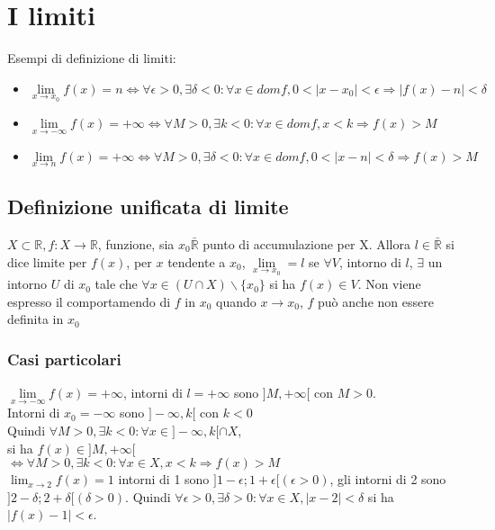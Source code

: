 \chapter{I limiti}
Esempi di definizione di limiti:
\begin{itemize}
\item $\lim\limits_{x\rightarrow x_0}f(x)=n\Leftrightarrow\forall \epsilon>0, \exists \delta<0: \forall x\in domf, 0<|x-x_0|<\epsilon\Rightarrow |f(x)-n|<\delta$\\
\item $\lim\limits_{x\rightarrow -\infty}f(x)=+\infty\Leftrightarrow\forall M>0, \exists k<0: \forall x\in domf, x<k\Rightarrow f(x)>M$\\
\item $\lim\limits_{x\rightarrow n}f(x)=+\infty\Leftrightarrow\forall M>0, \exists \delta<0: \forall x\in domf, 0<|x-n|<\delta\Rightarrow f(x)>M$\\
\end{itemize}
\section{Definizione unificata di limite}
$X\subset\mathbb{R}, f:X\rightarrow\mathbb{R}$, funzione, sia $x_0\bar{\mathbb{R}}$ punto di accumulazione per X. Allora $l\in\bar{\mathbb{R}}$ si dice limite per $f(x)$, per 
$x$ tendente a $x_0$, $\lim\limits_{x \rightarrow x_0}=l$ se $\forall V$, intorno di $l$, $\exists$ un intorno $U$ di $x_0$ tale che $\forall x\in (U\cap X)\backslash\{x_0\}$ si ha $f(x)\in V$. Non viene espresso il comportamendo di $f$ in $x_0$ quando $x\rightarrow x_0$, $f$ pu\`o anche non essere definita in $x_0$
\subsection{Casi particolari}
$\lim\limits_{x\rightarrow -\infty} f(x)=+\infty$, intorni di $l=+\infty$ sono $]M,+\infty[$ con $M>0$.\\
Intorni di $x_0=-\infty$ sono $]-\infty,k[$ con $k<0$\\
Quindi $\forall M>0, \exists k<0:\forall x\in ]-\infty,k[\cap X$,\\
si ha $f(x)\in ]M,+\infty[$\\
$\Leftrightarrow \forall M>0, \exists k<0:\forall x\in X, x<k\Rightarrow f(x)>M$\\
$\lim_{x\rightarrow 2} f(x)=1$ intorni di 1 sono $]1-\epsilon;1+\epsilon[ (\epsilon>0)$, gli intorni di 2 sono $]2-\delta;2+\delta[(\delta>0)$. Quindi $\forall\epsilon>0, 
\exists \delta>0:\forall x\in X, |x-2|<\delta$ si ha $|f(x)-1|<\epsilon$.\\
